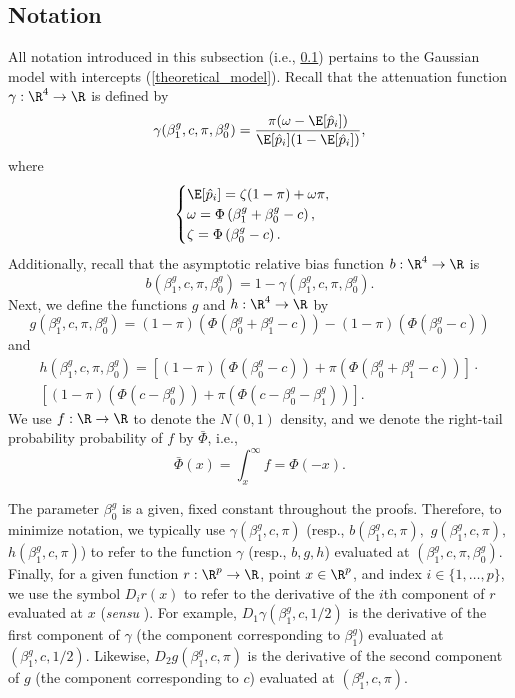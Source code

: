 \documentclass[12pt]{article}
\begin{document}
\begin{appendices}
\subsection{Notation}\label{sec:notation}
 All notation introduced in this subsection (i.e., \ref{sec:notation}) pertains to the Gaussian model with intercepts (\ref{theoretical_model}). Recall that the attenuation function $\gamma: \R^4 \to \R$ is defined by
$$ \gamma(\beta^g_1, c, \pi, \beta^g_0) = \frac{\pi(\omega - \E[\hat{p}_i])}{ \E[\hat{p}_i](1 -\E[\hat{p}_i])},$$ where $$\begin{cases} \E[\hat{p}_i] = \zeta(1-\pi) + \omega\pi, \\
\omega = \Phi\left(\beta_1^g + \beta_0^g - c \right) ,\\ \zeta = \Phi\left( \beta^g_0 - c \right).
\end{cases}$$ Additionally, recall that the asymptotic relative bias function $b: \R^4 \to \R$ is
$$ b(\beta^g_1, c, \pi, \beta^g_0) = 1 - \gamma(\beta^g_1, c, \pi, \beta^g_0).$$ Next, we define the functions $g$ and $h: \R^4 \to \R$ by
\begin{equation}\label{def_g}
g(\beta^g_1, c, \pi, \beta^g_0) = (1-\pi)\left( \Phi(\beta_0^g + \beta_1^g - c)\right) - (1-\pi)\left(\Phi(\beta_0^g - c)\right)\end{equation}
 and
\begin{multline}\label{def_h}
h(\beta^g_1, c, \pi, \beta^g_0) = \left[(1-\pi)\left( \Phi(\beta_0^g - c)\right) + \pi\left(\Phi(\beta^g_0 + \beta^g_1 - c) \right) \right] \cdot \\ \left[(1-\pi)\left( \Phi(c - \beta^g_0) \right) + \pi\left(\Phi(c - \beta_0^g - \beta_1^g) \right) \right].
\end{multline}
We use $f:\R \to \R$ to denote the $N(0,1)$ density, and we denote the right-tail probability probability of $f$ by $\bar{\Phi}$, i.e., 
$$\bar{\Phi}(x) = \int_{x}^{\infty} f = \Phi(-x).$$

The parameter $\beta^g_0$ is a given, fixed constant throughout the proofs. Therefore, to minimize notation, we typically use $\gamma(\beta^g_1, c, \pi)$ (resp., $b(\beta^g_1, c, \pi),$ $g(\beta^g_1, c, \pi),$ $h(\beta^g_1, c, \pi)$) to refer to the function $\gamma$ (resp., $b, g, h$) evaluated at $(\beta^g_1, c, \pi, \beta^g_0)$. Finally, for a given function $r: \R^{p} \to \R$, point $x \in \R^p$, and index $i \in \{1, \dots, p\}$, we use the symbol $D_i r(x)$ to refer to the derivative of the $i$th component of $r$ evaluated at $x$ (\textit{sensu} \cite{fitzpatrick2009}). For example, $D_1 \gamma(\beta^g_1, c, 1/2)$ is the derivative of the first component of $\gamma$ (the component corresponding to $\beta^g_1$) evaluated at $(\beta^g_1, c, 1/2)$. Likewise,  $D_2g(\beta^g_1, c, \pi)$ is the derivative of the second component of $g$ (the component corresponding to $c$) evaluated at $(\beta^g_1, c, \pi).$


\end{appendices}
\end{document}
